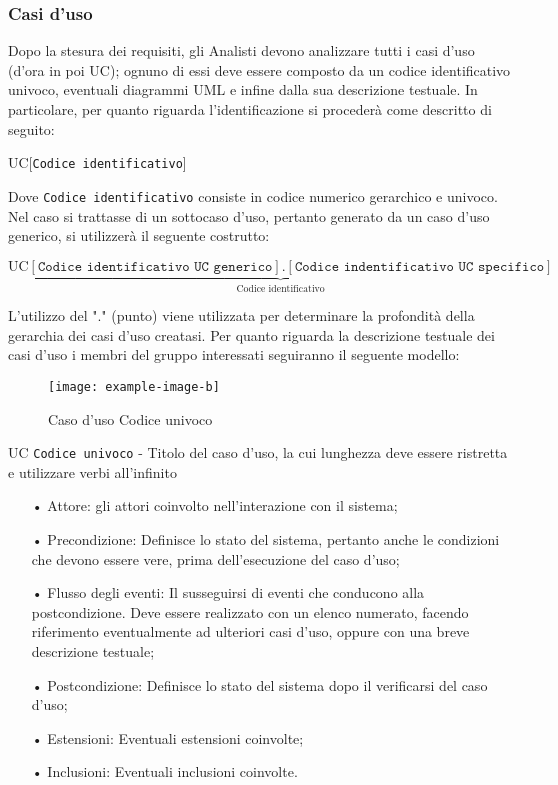 \subsubsection{Casi d'uso}
Dopo la stesura dei requisiti, gli Analisti devono analizzare tutti i casi d'uso (d'ora in poi UC); ognuno di essi deve essere composto da un codice identificativo univoco, eventuali diagrammi UML e infine dalla sua descrizione testuale. In particolare, per quanto riguarda l'identificazione si procederà come descritto di seguito:
\begin{center}
UC[\texttt{Codice identificativo}]
\end{center}
Dove \texttt{Codice identificativo} consiste in codice numerico {gerarchico} e univoco.
Nel caso si trattasse di un {sottocaso d'uso}, pertanto generato da un caso d'uso generico, si utilizzerà il seguente costrutto:
\begin{center}
$\text{UC}\underbrace{[\texttt{Codice identificativo UC generico}].[\texttt{Codice indentificativo UC specifico}]}_{\text{Codice   identificativo}}$
\end{center}
L'utilizzo del "." (punto) viene utilizzata per determinare la profondità della gerarchia dei casi d'uso creatasi.
Per quanto riguarda la descrizione testuale dei casi d'uso i membri del gruppo interessati seguiranno il seguente modello:
\begin{figure}[H]
\centering
\texttt{[image: example-image-b]}
\caption{Caso d'uso Codice univoco}
\end{figure}
UC \texttt{Codice univoco} - Titolo del caso d'uso, la cui lunghezza deve essere ristretta e utilizzare verbi all'infinito
\begin{itemize}
\item[•] Attore: gli attori coinvolto nell'interazione con il sistema;
\item[•] Precondizione: Definisce lo stato del sistema, pertanto anche le condizioni che devono essere vere, prima dell'esecuzione del caso d'uso;
\item[•] Flusso degli eventi: Il susseguirsi di eventi che conducono alla postcondizione. Deve essere realizzato con un elenco numerato, facendo riferimento eventualmente ad ulteriori casi d'uso, oppure con una breve descrizione testuale;
\item[•] Postcondizione: Definisce lo stato del sistema dopo il verificarsi del caso d'uso; 
\item[•] Estensioni: Eventuali estensioni coinvolte;
\item[•] Inclusioni: Eventuali inclusioni coinvolte.
\end{itemize}



